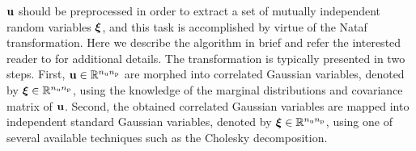$\mathbf{u}$ should be preprocessed in order to extract a set of mutually independent random variables $\bm{\xi}$, and this task is accomplished by virtue of the Nataf transformation.
Here we describe the algorithm in brief and refer the interested reader to \cite{li2008} for additional details.
The transformation is typically presented in two steps.
First, $\mathbf{u} \in \mathbb{R}^{{n_\text{u}} {n_\text{p}}}$ are morphed into correlated Gaussian variables, denoted by $\bm{\xi} \in \mathbb{R}^{{n_\text{u}} {n_\text{p}}}$, using the knowledge of the marginal distributions and covariance matrix of $\mathbf{u}$.
Second, the obtained correlated Gaussian variables are mapped into independent standard Gaussian variables, denoted by $\bm{\xi} \in \mathbb{R}^{{n_\text{u}} {n_\text{p}}}$, using one of several available techniques such as the Cholesky decomposition.
